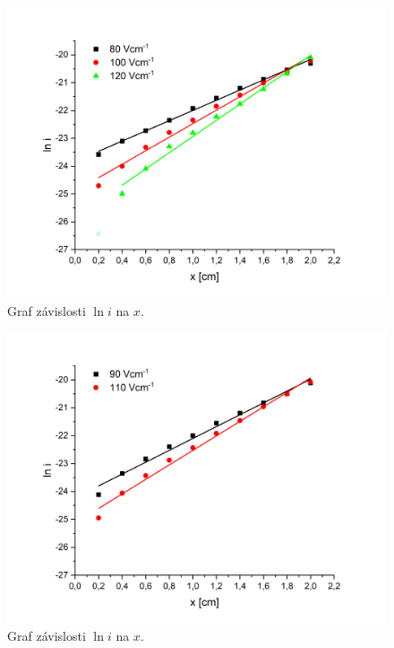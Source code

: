 \documentclass[a4paper,12pt]{article}
\begin{document}
\begin{figure}[h!]
	\centering
	\includegraphics[width=145mm]{lni80-120.png}
	\caption{Graf závislosti $\ln i$ na $x$.}
	\label{lni80-120}
\end{figure}

\begin{figure}[h!]
	\centering
	\includegraphics[width=145mm]{lni90-110.png}
	\caption{Graf závislosti $\ln i$ na $x$.}
	\label{lni90-110}
\end{figure}
\end{document}
